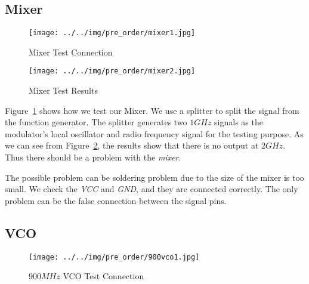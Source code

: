 \documentclass[]{article}
\begin{document}
\subsection{Mixer}
    \begin{figure}[t!]
        \begin{center}
            \vspace{-0.3in}
            \texttt{[image: ../../img/pre\_order/mixer1.jpg]}
            \caption{Mixer Test Connection}
            \label{fig:mixer1}
        \end{center}
    \end{figure}

    \begin{figure}[b!]
        \begin{center}
            \vspace{-0in}
            \texttt{[image: ../../img/pre\_order/mixer2.jpg]}
            \caption{Mixer Test Results}
            \label{fig:mixer2}
        \end{center}
    \end{figure}

    Figure~\ref{fig:mixer1} shows how we test our Mixer. We use a splitter to
    split the signal from the function generator. The splitter generates two
    $1GHz$ signals as the modulator's local oscillator and radio frequency
    signal for the testing purpose. As we can see from Figure~\ref{fig:mixer2},
    the results show that there is no output at $2GHz$. Thus there should be a
    problem with the \textit{mixer}.

    The possible problem can be soldering problem due to the size of the mixer
    is too small. We check the \textit{VCC} and \textit{GND}, and they are
    connected correctly. The only problem can be the false connection between
    the signal pins.

\subsection{VCO}
    \begin{figure}[t!]
        \begin{center}
            \vspace{-0.3in}
            \texttt{[image: ../../img/pre\_order/900vco1.jpg]}
            \caption{$900MHz$ VCO Test Connection}
            \label{fig:900vco1}
        \end{center}
    \end{figure}
\end{document}
